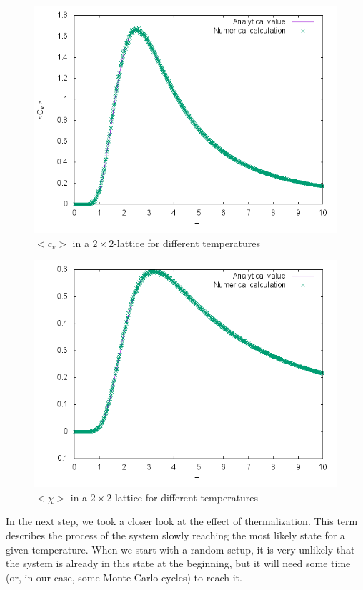 \documentclass[10pt,a4paper]{article}
\begin{document}
\begin{figure}[h]
	\includegraphics[width=\textwidth]{Heat_capacity.png}
	\caption{$<c_v>$ in a $2\times 2$-lattice for different temperatures\label{b_Cv}}
\end{figure}
\begin{figure}[h]
	\includegraphics[width=\textwidth]{Susceptibility.png}
	\caption{$<\chi>$ in a $2\times 2$-lattice for different temperatures\label{b_chi}}
\end{figure}
In the next step, we took a closer look at the effect of thermalization. This term describes the process of the system slowly reaching the most likely state for a given temperature. When we start with a random setup, it is very unlikely that the system is already in this state at the beginning, but it will need some time (or, in our case, some Monte Carlo cycles) to reach it.
\end{document}
